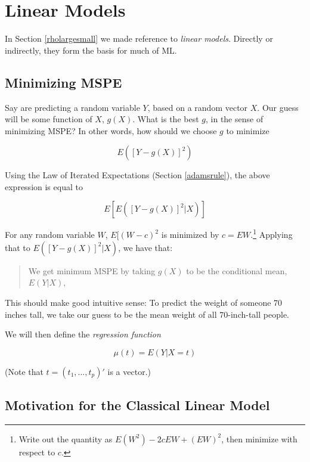 \chapter{Linear Models}  
\label{chap:linmod} 

In Section \ref{rholargesmall} we made reference to \textit{linear
models}.  Directly or indirectly, they form the basis for much of ML.

\section{Minimizing MSPE}

Say are predicting a random variable $Y$, based on a random vector $X$.
Our guess will be some function of $X$, $g(X)$.  What is the best $g$,
in the sense of minimizing MSPE?  In other words, how should we choose
$g$ to minimize

\begin{equation}
E \left ( [Y - g(X)]^2 \right )
\end{equation}

Using the Law of Iterated Expectations (Section \ref{adamsrule}), the
above expression is equal to

\begin{equation}
E \left [ E \left ( [Y - g(X)]^2 | X \right ) \right ]
\end{equation}

For any random variable $W$, $E[ (W - c)^2$ is minimized by $c =
EW$.\footnote{Write out the quantity as $E(W^2) -2c EW + (EW)^2$, then
minimize with respect to $c$.}  Applying that to
$E \left ( [Y - g(X)]^2 | X \right ) $, we have that:

\begin{quote}
We get minimum MSPE by taking $g(X)$ to be the conditional mean, $E(Y|X)$,
\end{quote}

This should make good intuitive sense:  To predict the weight of
someone 70 inches tall, we take our guess to be the mean weight of all
70-inch-tall people.

We will then define the \textit{regression function}

\begin{equation}
\mu(t) = E (Y | X = t)
\end{equation}

(Note that $t = (t_1,...,t_p)'$ is a vector.)

\section{Motivation for the Classical Linear Model}

